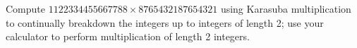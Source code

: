Compute $1122334455667788 \times 8765432187654321$ using
Karasuba multiplication to continually breakdown the integers
up to integers of length 2;
use your calculator to perform multiplication of length 2 integers.
